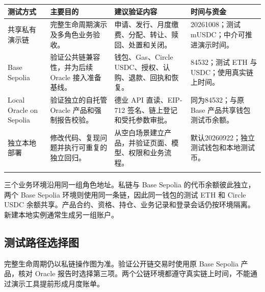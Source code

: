 \documentclass[12pt,a4paper]{article}
\begin{document}
\begin{longtable}{L{2.5cm}L{4.2cm}L{4.5cm}L{3cm}}\toprule 测试方式 & 主要目的 & 建议验证内容 & 时间与资金\\\midrule\endhead
共享私有演示链 & 完整生命周期演示及多角色业务验收。 & 申请、发行、月度缴费、分配、转让、赎回、处置和关闭。 & 20261008；测试 mUSDC；中介可推进演示时间。\\\addlinespace
Base Sepolia & 验证公共链兼容性，并为后续 Oracle 接入准备基线。 & 钱包、Gas、Circle USDC、授权、认购、退款、回执和恢复。 & 84532；测试 ETH 与 USDC；使用真实链上时间。\\\addlinespace
Local Oracle on Sepolia & 验证独立的自托管 Oracle 产品和强制报告校验。 & 德业 API 直读、EIP-712 签名、链上登记和受托参数审批。 & 同为84532；与原 Base 产品共享钱包测试币余额。\\\addlinespace
独立本地部署 & 修改代码、复现问题并执行可重复的独立回归。 & 从空白场景建立产品，并验证页面、模型、权限和业务流程。 & 默认20260922；独立测试钱包和本地测试币。\\\addlinespace
\bottomrule\end{longtable}
三个业务环境沿用同一组角色地址。私链与 Base Sepolia 的代币余额彼此独立，两个 Base Sepolia 环境则使用同一条链，因此同一钱包的测试 ETH 和 Circle USDC 余额共享。产品合约、资格、持仓、业务记录和登录会话仍按环境隔离。新建本地实例通常生成另一组账户。

\clearpage
\subsection{测试路径选择图}
\begin{center}\end{center}
完整生命周期仍以私链操作图为准。验证公开链交易时使用原 Base Sepolia 产品，核对 Oracle 报告时选择第三项。两个公链环境都遵守真实链上时间，不能通过演示工具提前形成月度账单。
\end{document}

